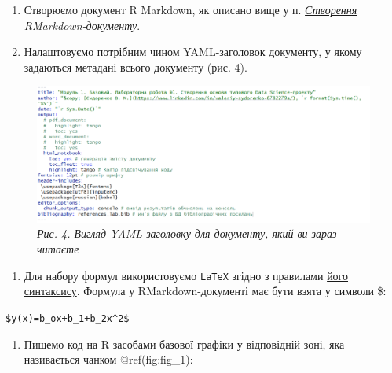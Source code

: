 \documentclass[
]{book}
\providecommand{\tightlist}{%
  \setlength{\itemsep}{0pt}\setlength{\parskip}{0pt}}
\begin{document}
\begin{enumerate}
\def\labelenumi{\arabic{enumi}.}
\item
  Створюємо документ R Markdown, як описано вище у п. \protect\hyperlink{CreateRMarkdown}{\emph{Створення RMarkdown-документу}}.
\item
  Налаштовуємо потрібним чином YAML-заголовок документу, у якому задаються метадані всього документу (рис. 4).
\end{enumerate}

\begin{figure}
\centering
\includegraphics{image/YAML.png}
\caption{\emph{Рис. 4. Вигляд YAML-заголовку для документу, який ви зараз читаєте}}
\end{figure}

\begin{enumerate}
\def\labelenumi{\arabic{enumi}.}
\setcounter{enumi}{2}
\tightlist
\item
  Для набору формул використовуємо \texttt{LaTeX} згідно з правилами \href{https://en.wikibooks.org/wiki/LaTeX/Mathematics}{його синтаксису}. Формула у RMarkdown-документі має бути взята у символи \$:
\end{enumerate}

\texttt{\$y(x)=b\_ox+b\_1+b\_2x\^{}2\$}

\begin{enumerate}
\def\labelenumi{\arabic{enumi}.}
\setcounter{enumi}{2}
\tightlist
\item
  Пишемо код на R засобами базової графіки у відповідній зоні, яка називається чанком @ref(fig:fig\_1):
\end{enumerate}
\end{document}

